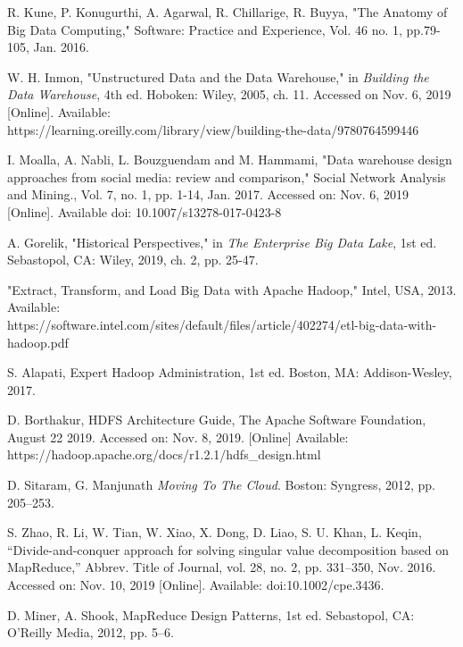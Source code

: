 \documentclass[journal]{IEEEtran}
\begin{document}
\begin{thebibliography}{1}

R. Kune, P. Konugurthi, A. Agarwal, R. Chillarige, R. Buyya,
 "The Anatomy of Big Data Computing," Software: Practice and Experience,
 Vol. 46 no. 1, pp.79-105, Jan. 2016. 

W. H. Inmon, "Unstructured Data and the Data Warehouse," in 
  \emph{Building the Data Warehouse},
  4th ed. Hoboken: Wiley, 2005, ch. 11.
  Accessed on Nov. 6, 2019 [Online]. 
  Available: \\ https://learning.oreilly.com/library/view/building-the-data/9780764599446

I. Moalla, A. Nabli, L. Bouzguendam and M. Hammami,
 "Data warehouse design approaches from social media: review and comparison,"
 Social Network Analysis and Mining., Vol. 7, no. 1, pp. 1-14, Jan. 2017.
 Accessed on: Nov. 6, 2019 [Online]. 
 Available doi: 10.1007/s13278-017-0423-8

A. Gorelik, "Historical Perspectives," in 
 \emph{The Enterprise Big Data Lake},
 1st ed. Sebastopol, CA: Wiley, 2019, ch. 2, pp. 25-47.

 "Extract, Transform, and Load Big Data with Apache Hadoop," Intel, USA, 2013.
 Available:\\ https://software.intel.com/sites/default/files/article/402274/etl-big-data-with-hadoop.pdf

S. Alapati, Expert Hadoop Administration, 1st ed. Boston, MA: Addison-Wesley, 2017.

D. Borthakur, HDFS Architecture Guide, The Apache Software Foundation,
 August 22 2019. Accessed on: Nov. 8, 2019. [Online] Available: \\
 https://hadoop.apache.org/docs/r1.2.1/hdfs\_design.html

D. Sitaram, G. Manjunath \textit{Moving To The Cloud}. Boston: Syngress, 2012, pp. 205–253.

S. Zhao, R. Li, W. Tian, W. Xiao, X. Dong, D. Liao, S. U. Khan, L. Keqin, 
 “Divide-and-conquer approach for solving singular value decomposition based on MapReduce,” Abbrev. Title of Journal, vol. 28, no. 2, pp. 331–350, Nov. 2016. 
 Accessed on: Nov. 10, 2019 [Online]. Available: doi:10.1002/cpe.3436.

D. Miner, A. Shook, MapReduce Design Patterns, 1st ed. Sebastopol, CA: O'Reilly Media, 2012,
 pp. 5–6.


\end{thebibliography}
\end{document}
